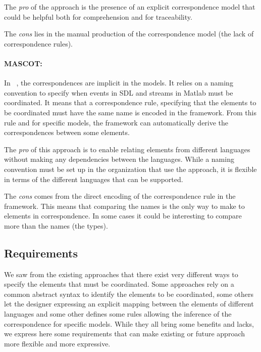 The \emph{pro} of the approach is the presence of an explicit correspondence model that could be helpful both for comprehension and for traceability.

The \emph{cons} lies in the manual production of the correspondence model (\ie the lack of correspondence rules).



\paragraph{MASCOT: }
In ~\cite{mascotbib}, the correspondences are implicit in the models. It relies on a naming convention to specify when events in SDL and streams in Matlab must be coordinated. It means that a correspondence rule, specifying that the elements to be coordinated must have the same name is encoded in the framework. From this rule and for specific models, the framework can automatically derive the correspondences between some elements.

The \emph{pro} of this approach is to enable relating elements from different languages without making any dependencies between the languages. While a naming convention must be set up in the organization that use the approach, it is flexible in terms of the different languages that can be supported.

The \emph{cons} comes from the direct encoding of the correspondence rule in the framework. This means that comparing the names is the only way to make to elements in correspondence. In some cases it could be interesting to compare more than the names (\eg the types).

\subsection{Requirements}

We saw from the existing approaches that there exist very different ways to specify the elements that must be coordinated. Some approaches rely on a common abstract syntax to identify the elements to be coordinated, some others let the designer expressing an explicit mapping between the elements of different languages and some other defines some rules allowing the inference of the correspondence for specific models. While they all bring some benefits and lacks, we express here some requirements that can make existing or future approach more flexible and more expressive.

